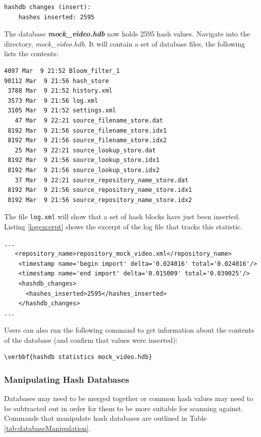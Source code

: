 \documentclass[11pt,fleqn]{article} %
\begin{document}
\begingroup
\footnotesize
\begin{Verbatim}[fontfamily=courier]
hashdb changes (insert):
    hashes inserted: 2595
\end{Verbatim}
\endgroup
The database \textit{\textbf{mock\_video.hdb}} now holds 2595 hash values. Navigate into the directory, \textit{mock\_video.hdb}. It will contain a set of database files, the following lists the contents:
\begingroup
\footnotesize
\begin{Verbatim}[fontfamily=courier]
 4097 Mar  9 21:52 Bloom_filter_1
90112 Mar  9 21:56 hash_store
 3788 Mar  9 21:52 history.xml
 3573 Mar  9 21:56 log.xml
 3105 Mar  9 21:52 settings.xml
   47 Mar  9 22:21 source_filename_store.dat
 8192 Mar  9 21:56 source_filename_store.idx1
 8192 Mar  9 21:56 source_filename_store.idx2
   25 Mar  9 22:21 source_lookup_store.dat
 8192 Mar  9 21:56 source_lookup_store.idx1
 8192 Mar  9 21:56 source_lookup_store.idx2
   37 Mar  9 22:21 source_repository_name_store.dat
 8192 Mar  9 21:56 source_repository_name_store.idx1
 8192 Mar  9 21:56 source_repository_name_store.idx2
\end{Verbatim}
\endgroup

The file \texttt{log.xml} will show that a set of hash blocks have just been inserted. Listing \ref{logexcerpt} shows the excerpt of the log file that tracks this statistic.
\lstset{style=customfile}
\begin{lstlisting}[float, caption=Excerpt of the \texttt{log.xml} indicating hash blocks were inserted, label=logexcerpt]
...   
   <repository_name>repository_mock_video.xml</repository_name>
    <timestamp name='begin import' delta='0.024016' total='0.024016'/>
    <timestamp name='end import' delta='0.015009' total='0.039025'/>
    <hashdb_changes>
      <hashes_inserted>2595</hashes_inserted>      
    </hashdb_changes>
...
\end{lstlisting}
Users can also run the following command to get information about the contents of the database (and confirm that values were inserted):
\begin{Verbatim}[commandchars=\\\{\}]
\verbbf{hashdb statistics mock_video.hdb}
\end{Verbatim}

\subsubsection{Manipulating Hash Databases}
Databases may need to be merged together or common hash values may need to be subtracted out in order for them to be more suitable for scanning against.
Commands that manipulate hash databases are outlined in Table \ref{tab:databaseManipulation}.
\end{document}
